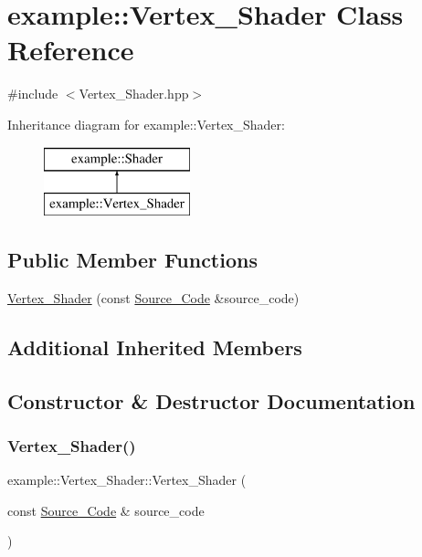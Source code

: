 \hypertarget{classexample_1_1_vertex___shader}{}\section{example\+:\+:Vertex\+\_\+\+Shader Class Reference}
\label{classexample_1_1_vertex___shader}


{\ttfamily \#include $<$Vertex\+\_\+\+Shader.\+hpp$>$}

Inheritance diagram for example\+:\+:Vertex\+\_\+\+Shader\+:\begin{figure}[H]
\begin{center}
\leavevmode
\includegraphics[height=2.000000cm]{classexample_1_1_vertex___shader}
\end{center}
\end{figure}
\subsection*{Public Member Functions}
\begin{DoxyCompactItemize}
\item 
\mbox{\hyperlink{classexample_1_1_vertex___shader_a4c9c616101a9c97e61a2e5c1563cdda7}{Vertex\+\_\+\+Shader}} (const \mbox{\hyperlink{classexample_1_1_shader_1_1_source___code}{Source\+\_\+\+Code}} \&source\+\_\+code)
\end{DoxyCompactItemize}
\subsection*{Additional Inherited Members}


\subsection{Constructor \& Destructor Documentation}
\mbox{\label{classexample_1_1_vertex___shader_a4c9c616101a9c97e61a2e5c1563cdda7}} 
\subsubsection{\texorpdfstring{Vertex\+\_\+\+Shader()}{Vertex\_Shader()}}
{\footnotesize\ttfamily example\+::\+Vertex\+\_\+\+Shader\+::\+Vertex\+\_\+\+Shader (\begin{DoxyParamCaption}\item[{const \mbox{\hyperlink{classexample_1_1_shader_1_1_source___code}{Source\+\_\+\+Code}} \&}]{source\+\_\+code }\end{DoxyParamCaption})\hspace{0.3cm}{\ttfamily [inline]}}



